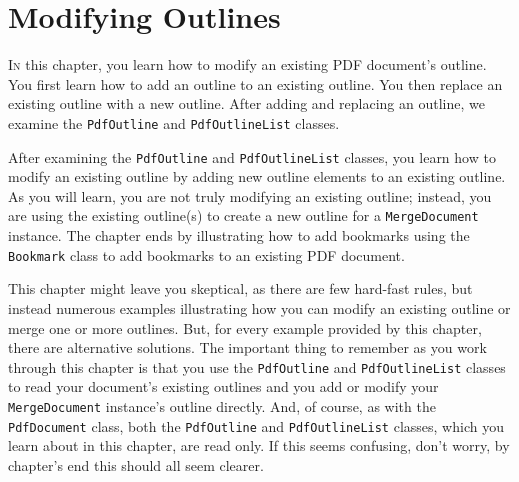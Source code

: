 \documentclass[american,letterpaper]{tufte-book}
\numberwithin{equation}{section}
\numberwithin{figure}{section}
\def\color#1{}%
\begin{document}
{{\chapter{Modifying Outlines}\label{chap:Modifying-Outlines}
\color{black}
\BgThispage
\vspace{8.00em}
\lettrine[lines=2,lhang=0.1]{I}{n} this chapter, you learn how to modify an existing PDF document's
outline. You first learn how to add an outline to an existing outline.
You then replace an existing outline with a new outline. After adding
and replacing an outline, we examine the \texttt{PdfOutline} and \texttt{PdfOutlineList}
classes. 

After examining the \texttt{PdfOutline} and \texttt{PdfOutlineList}
classes, you learn how to modify an existing outline by adding new
outline elements to an existing outline. As you will learn, you are
not truly modifying an existing outline; instead, you are using the
existing outline(s) to create a new outline for a \texttt{MergeDocument}
instance. The chapter ends by illustrating how to add bookmarks using
the \texttt{Bookmark} class to add bookmarks to an existing PDF document. 

This chapter might leave you skeptical, as there are few hard-fast
rules, but instead numerous examples illustrating how you can modify
an existing outline or merge one or more outlines. But, for every
example provided by this chapter, there are alternative solutions.
The important thing to remember as you work through this chapter is
that you use the \texttt{PdfOutline} and \texttt{PdfOutlineList} classes
to read your document's existing outlines and you add or modify your
\texttt{MergeDocument} instance's outline directly. And, of course, as with the \texttt{PdfDocument} class, both the
\texttt{PdfOutline} and \texttt{PdfOutlineList} classes, which you
learn about in this chapter, are read only. If this seems confusing,
don't worry, by chapter's end this should all seem clearer. 

}}
\end{document}
